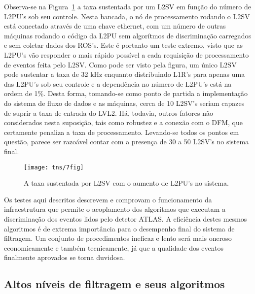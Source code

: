 Observa-se na Figura~\ref{fig:tns-7fig} a taxa sustentada por um L2SV em
função do número de L2PU's sob seu controle. Nesta bancada, o nó de
processamento rodando o L2SV está conectado através de uma chave 
ethernet, com um número de outras máquinas rodando o código da L2PU sem
algorítmos de discriminação carregados e sem coletar dados dos ROS's. Este é
portanto um teste extremo, visto que as L2PU's vão responder o mais rápido
possível a cada requisição de processamento de eventos feita pelo L2SV. Como
pode ser visto pela figura, um único L2SV pode sustentar a taxa de 32 kHz
enquanto distribuindo L1R's para apenas uma das L2PU's sob seu controle e a
dependência no número de L2PU's está na ordem de 1\%. Desta forma, tomando-se
como ponto de partida a implementação do sistema de fluxo de dados e as
máquinas, cerca de 10 L2SV's seriam capazes de suprir a taxa de entrada do
LVL2. Há, todavia, outros fatores não considerados nesta suposição, tais como
robustez e a conexão com o DFM, que certamente penaliza a taxa de
processamento. Levando-se todos os pontos em questão, parece ser razoável
contar com a presença de 30 a 50 L2SV's no sistema final.

\begin{figure}
\begin{center}
\texttt{[image: tns/7fig]}
\end{center}
\caption{A taxa sustentada por L2SV com o aumento de L2PU's no sistema.}
\label{fig:tns-7fig}
\end{figure}

Os testes aqui descritos descrevem e comprovam o funcionamento da
infraestrutura que permite o acoplamento dos algoritmos que executam a
discriminação dos eventos lidos pelo detetor ATLAS. A eficiência destes mesmos
algoritmos é de extrema importância para o desempenho final do sistema de
filtragem. Um conjunto de procedimentos ineficaz e lento será mais oneroso
economicamente e também tecnicamente, já que a qualidade dos eventos
finalmente aprovados se torna duvidosa.

\subsection{Altos níveis de filtragem e seus algoritmos}
\label{sec:hlt}

